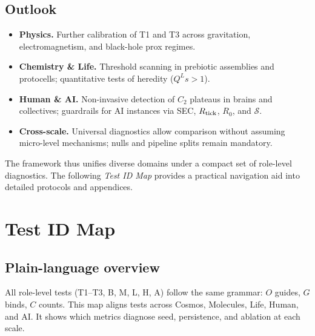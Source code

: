 \documentclass[12pt,a4paper,oneside]{scrreprt}
\begin{document}
\section*{Outlook}
\begin{itemize}
\item \textbf{Physics.} Further calibration of T1 and T3 across gravitation, electromagnetism, and black-hole prox regimes.
\item \textbf{Chemistry \& Life.} Threshold scanning in prebiotic assemblies and protocells; quantitative tests of heredity ($Q^Ls>1$).
\item \textbf{Human \& AI.} Non-invasive detection of $C_2$ plateaus in brains and collectives; guardrails for AI instances via SEC, $R_{\rm tick}$, $R_0$, and $\mathcal S$.
\item \textbf{Cross-scale.} Universal diagnostics allow comparison without assuming micro-level mechanisms; nulls and pipeline splits remain mandatory.
\end{itemize}

\noindent
The framework thus unifies diverse domains under a compact set of role-level diagnostics. 
The following \emph{Test ID Map} provides a practical navigation aid into detailed protocols and appendices.

\chapter*{Test ID Map}
\section*{Plain-language overview}
All role-level tests (T1–T3, B, M, L, H, A) follow the same grammar: 
$O$ guides, $G$ binds, $C$ counts. 
This map aligns tests across Cosmos, Molecules, Life, Human, and AI. 
It shows which metrics diagnose seed, persistence, and ablation at each scale.
\end{document}
